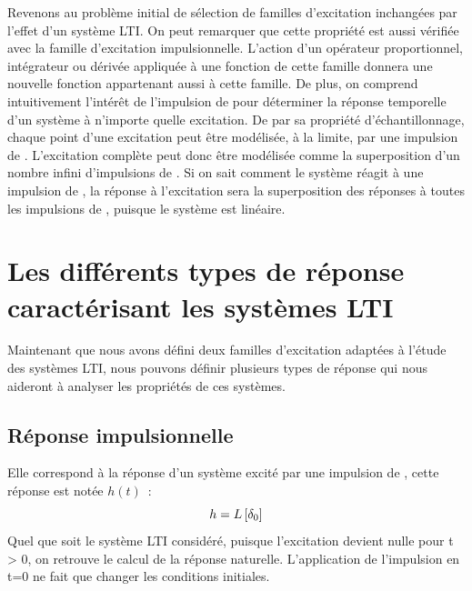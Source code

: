         Revenons au problème initial de sélection de familles
        d'excitation inchangées par l'effet d'un système LTI. On peut
        remarquer que cette propriété est aussi vérifiée avec la
        famille d'excitation impulsionnelle. L'action d'un opérateur
        proportionnel, intégrateur ou dérivée appliquée à une fonction
        de cette famille donnera une nouvelle fonction appartenant
        aussi à cette famille. De plus, on comprend intuitivement
        l'intérêt de l'impulsion de \Dirac{} pour déterminer la
        réponse temporelle d'un système à n'importe quelle
        excitation. De par sa propriété d'échantillonnage, chaque
        point d'une excitation peut être modélisée, à la limite, par
        une impulsion de \Dirac. L'excitation complète peut donc être
        modélisée comme la superposition d'un nombre infini
        d'impulsions de \Dirac. Si on sait comment le système réagit à
        une impulsion de \Dirac, la réponse à l'excitation sera la
        superposition des réponses à toutes les impulsions de \Dirac,
        puisque le système est linéaire.
	
	
	
	\section{Les différents types de réponse caractérisant les systèmes LTI}
	Maintenant que nous avons défini deux familles d'excitation
        adaptées à l'étude des systèmes LTI, nous pouvons définir
        plusieurs types de réponse qui nous aideront à analyser les
        propriétés de ces systèmes.
		
	
	\subsection{Réponse impulsionnelle}
	Elle correspond à la réponse d'un système excité par une
        impulsion de \Dirac, cette réponse est notée $h(t)$~:
	\begin{equation}
          h = L\left[\delta_0\right]
        \end{equation}
	Quel que soit le système LTI considéré, puisque l'excitation
        devient nulle pour t > 0, on retrouve le calcul de la réponse
        naturelle. L'application de l'impulsion en t=0 ne fait que
        changer les conditions initiales.
	
